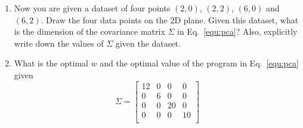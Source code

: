 \begin{Q}
\begin{enumerate}
\item Now you are given a dataset of four points $(2,0)$, $(2,2)$, $(6,0)$ and $(6,2)$. Draw the four data points on the 2D plane. Given this dataset, what is the dimension of the covariance matrix $\Sigma$ in Eq.~\eqref{equ:pca}? Also, explicitly write down the values of $\Sigma$ given the dataset.

\item What is the optimal $w$ and the optimal value of the program in Eq.~\eqref{equ:pca}  given \[ \Sigma= \left[ \begin{array}{cccc}
	12 & 0 & 0 & 0\\
	0 & 6 & 0 & 0\\
	0 & 0 & 20 & 0\\
	0 & 0 & 0 & 10\\
	\end{array} \right]\] 


\end{enumerate}
\end{Q}
          